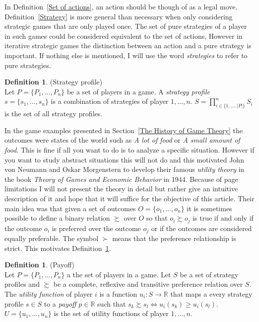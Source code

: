 \documentclass{article}
\theoremstyle{definition}
\newtheorem{definition}[theorem]{Definition}
\theoremstyle{remark}
\begin{document}
In Definition~\ref{Set of actions}, an action should be though of as a
legal move. Definition~\ref{Strategy} is more general than necessary
when only considering strategic games that are only played once. The
set of pure strategies of a player in such games could be considered
equivalent to the set of actions, However in iterative strategic games
the distinction between an action and a pure strategy is
important. If nothing else is mentioned, I will use the word
\emph{strategies} to refer to pure strategies.   

\begin{definition} (Strategy profile) \label{Strategy profile}\\
  Let $P = \{P_1,...,P_n\}$ be a set of players in a game. A
  \emph{strategy profile} $s = \{s_1,...,s_n\}$ is a combination of
  strategies of player $1,...,n$. $S = \prod_{i \in \{1,...,|P|\}}^n
  S_i $ is the set of all strategy profiles.
\end{definition}

In the game examples presented in Section~\ref{The History of Game
  Theory} the outcomes were states of the world such as \emph{A lot of
food} or \emph{A small amount of food}. This is fine if all you want
to do is to analyze a specific situation. However if you want to study
abstract situations this will not do and this motivated John von
Neumann and Oskar Morgenstern to develop their famous \emph{utility
  theory} in the book \emph{Theory of Games and Economic Behavior} in
1944. Because of page limitations I will not present the theory
in detail but rather give an intuitive description of it and hope that
it will suffice for the objective of this article. Their main idea was
that given a set of outcomes $O = \{o_1,...,o_n\}$ it is sometimes
possible to define a binary relation $\succsim$ over $O$ so that $o_i
\succsim o_j$ is true if and only if the outcome $o_i$ is preferred over the
outcome $o_j$ or if the outcomes are considered equally
preferable. The symbol $\succ$ means that the preference relationship
is strict. \citep{Maschler} This motivates Definition~\ref{Payoff}.

\begin{definition} (Payoff) \label{Payoff}\\
  Let $P = \{P_1,...,P_n\}$ a the set of players in a game. Let $S$ be
  a set of strategy profiles and $\succsim$ be a complete, reflexive
  and transitive preference relation over $S$. The
  \emph{utility function} of player $i$ is a function $u_i : S
  \rightarrow \mathbb{R}$ that maps a every strategy profile $s \in S$
  to a \emph{payoff} $p \in \mathbb{R}$ such that $s_k \succsim s_l
  \Leftrightarrow u_i(s_k) \geq u_i(s_l)$. $U = \{u_1,...,u_n\}$ is the
  set of utility functions of player $1,...,n$.
\end{definition}
\end{document}
